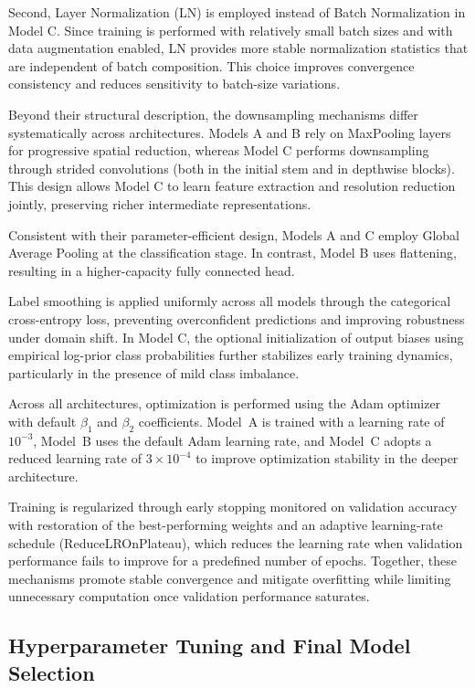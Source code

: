 \documentclass{article}
\begin{document}
Second, Layer Normalization (LN) is employed instead of Batch Normalization in Model C. 
Since training is performed with relatively small batch sizes and with data augmentation 
enabled, LN provides more stable normalization statistics that are independent of batch 
composition. This choice improves convergence consistency and reduces sensitivity to 
batch-size variations.

Beyond their structural description, the downsampling mechanisms differ systematically 
across architectures. Models A and B rely on MaxPooling layers for progressive spatial 
reduction, whereas Model C performs downsampling through strided convolutions (both in 
the initial stem and in depthwise blocks). This design allows Model C to learn feature 
extraction and resolution reduction jointly, preserving richer intermediate representations.

Consistent with their parameter-efficient design, Models A and C employ Global Average Pooling 
at the classification stage. In contrast, Model B uses flattening, resulting in a 
higher-capacity fully connected head.

Label smoothing is applied uniformly across all models through the categorical cross-entropy 
loss, preventing overconfident predictions and improving robustness under domain shift. In 
Model C, the optional initialization of output biases using empirical log-prior class 
probabilities further stabilizes early training dynamics, particularly in the presence of mild 
class imbalance.

Across all architectures, optimization is performed using the Adam optimizer 
with default $\beta_1$ and $\beta_2$ coefficients. 
Model~A is trained with a learning rate of $10^{-3}$, 
Model~B uses the default Adam learning rate, 
and Model~C adopts a reduced learning rate of $3 \times 10^{-4}$ 
to improve optimization stability in the deeper architecture.

Training is regularized through early stopping monitored on validation accuracy 
with restoration of the best-performing weights and an adaptive learning-rate 
schedule (ReduceLROnPlateau), which reduces the learning rate when validation 
performance fails to improve for a predefined number of epochs. 
Together, these mechanisms promote stable convergence and mitigate overfitting 
while limiting unnecessary computation once validation performance saturates.

\subsection{Hyperparameter Tuning and Final Model Selection}
\end{document}

